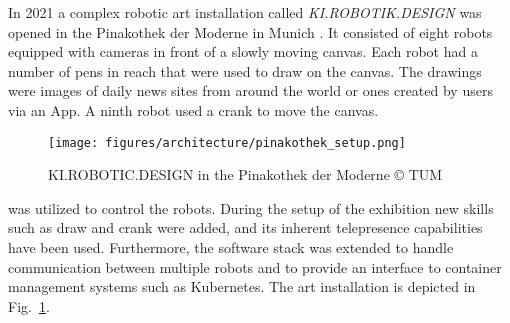 In 2021 a complex robotic art installation called \emph{KI.ROBOTIK.DESIGN} was opened in the Pinakothek der Moderne in Munich \cite{haddadin2021pinakothek}.
It consisted of eight robots equipped with cameras in front of a slowly moving canvas.
Each robot had a number of pens in reach that were used to draw on the canvas.
The drawings were images of daily news sites from around the world or ones created by users via an App.
A ninth robot used a crank to move the canvas.

\begin{figure}[ht!]
    \centering
    \texttt{[image: figures/architecture/pinakothek\_setup.png]}
    \caption{KI.ROBOTIC.DESIGN in the Pinakothek der Moderne \copyright{} TUM}
    \label{fig:architecture:system:pinakothek:setup}
\end{figure}

\softwareabbr{} was utilized to control the robots.
During the setup of the exhibition new skills such as draw and crank were added, and its inherent telepresence capabilities have been used.
Furthermore, the software stack was extended to handle communication between multiple robots and to provide an interface to container management systems such as Kubernetes.
The art installation is depicted in Fig.~\ref{fig:architecture:system:pinakothek:setup}.

